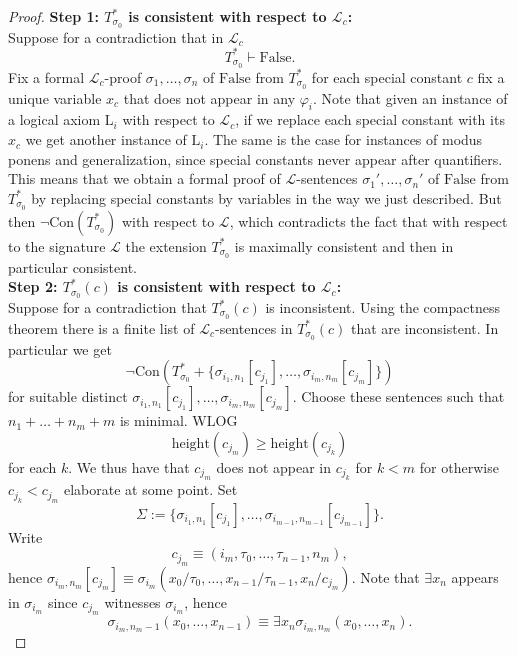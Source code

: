 \begin{proof}
    \textbf{Step 1: $T^\ast_{\sigma_0}$ is consistent with respect to $\mathcal{L}_c$:}\\
    Suppose for a contradiction that in $\mathcal{L}_c$
    $$
        T^\ast_{\sigma_0} \vdash \mathrm{False}.
    $$
    Fix a formal $\mathcal{L}_c$-proof $\sigma_1,\dots,\sigma_n$ of $\mathrm{False}$ from $T^\ast_{\sigma_0}$  
    for each special constant $c$ fix a unique variable $x_c$ that does not appear in any $\varphi_i$. Note that given an instance of a logical axiom $\mathrm{L}_i$ with respect to $\mathcal{L}_c$, if we replace each special constant with its $x_c$ we get another instance of $\mathrm{L}_i$. The same is the case for instances of modus ponens and generalization, since special constants never appear after quantifiers. This means that we obtain a formal proof of $\mathcal{L}$-sentences $\sigma_1',\dots,\sigma_n'$ of $\mathrm{False}$ from $T_{\sigma_0}^\ast$ by replacing special constants by variables in the way we just described. But then $\neg\mathrm{Con}(T^\ast_{\sigma_0})$ with respect to $\mathcal{L}$, which contradicts the fact that with respect to the signature $\mathcal{L}$ the extension $T_{\sigma_0}^\ast$ is maximally consistent and then in particular consistent.\\
    \textbf{Step 2: $T^\ast_{\sigma_0}(c)$ is consistent with respect to $\mathcal{L}_c$:}\\
    Suppose for a contradiction that $T_{\sigma_0}^\ast(c)$ is inconsistent. Using the compactness theorem there is a finite list of $\mathcal{L}_c$-sentences in $T^\ast_{\sigma_0}(c)$ that are inconsistent. In particular we get 
    $$
        \neg\mathrm{Con}(T^\ast_{\sigma_0}+\{\sigma_{i_1,n_1}[c_{j_1}],\dots,\sigma_{i_m,n_m}[c_{j_m}]\})
    $$
    for suitable distinct $\sigma_{i_1,n_1}[c_{j_1}],\dots,\sigma_{i_m,n_m}[c_{j_m}]$. Choose these sentences such that $n_1+\dots+n_m+m$ is minimal. WLOG 
    $$\mathrm{height}(c_{j_m}) \geq \mathrm{height}(c_{j_k})$$
    for each $k$. We thus have that $c_{j_m}$ does not appear in $c_{j_k}$ for $k<m$ for otherwise $c_{j_k}<c_{j_m}$ {\Large elaborate at some point}. Set
    $$
        \Sigma := \{\sigma_{i_1,n_1}[c_{j_1}],\dots,\sigma_{i_{m-1},n_{m-1}}[c_{j_{m-1}}]\}.
    $$
    Write 
    $$
        c_{j_m} \equiv (i_m,\tau_0,\dots,\tau_{n-1},n_m),
    $$  
    hence $\sigma_{i_m,n_m}[c_{j_m}]\equiv \sigma_{i_m}(x_0/\tau_0,\dots,x_{n-1}/\tau_{n-1},x_n/c_{j_m})$. Note that $\exists x_n$ appears in $\sigma_{i_m}$ since $c_{j_m}$ witnesses $\sigma_{i_m}$, hence
    $$\sigma_{i_m,n_m-1}(x_0,\dots,x_{n-1})\equiv \exists x_n \sigma_{i_m,n_m}(x_0,\dots,x_n).$$

\end{proof}
